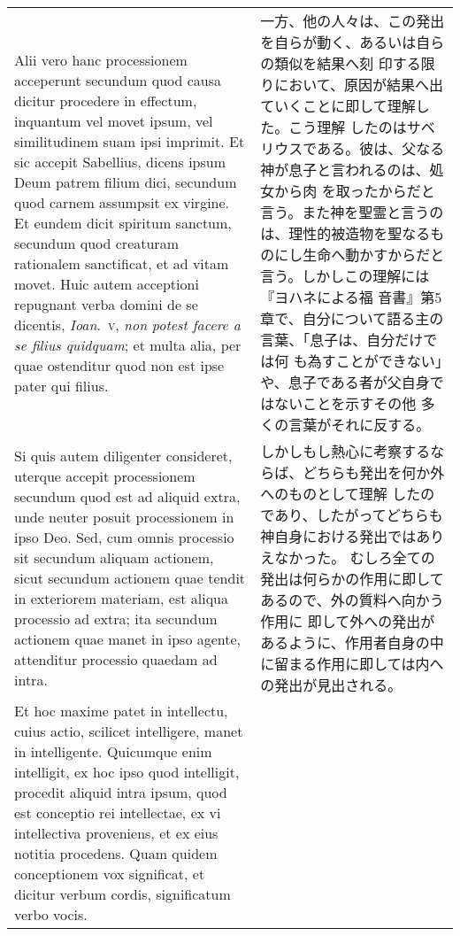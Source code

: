 \documentclass[10pt]{jsarticle} %
\begin{document}
\begin{longtable}{p{21em}p{21em}}
Alii vero hanc processionem acceperunt secundum
quod causa dicitur procedere in effectum, inquantum vel movet ipsum, vel
similitudinem suam ipsi imprimit. Et sic accepit Sabellius, dicens ipsum
Deum patrem filium dici, secundum quod carnem assumpsit ex virgine. Et
eundem dicit spiritum sanctum, secundum quod creaturam rationalem
sanctificat, et ad vitam movet. Huic autem acceptioni repugnant verba
domini de se dicentis, {\itshape Ioan}.~{\scshape v}, {\itshape non potest facere a se filius quidquam};
et multa alia, per quae ostenditur quod non est ipse pater qui
filius. 



&

一方、他の人々は、この発出を自らが動く、あるいは自らの類似を結果へ刻
 印する限りにおいて、原因が結果へ出ていくことに即して理解した。こう理解
 したのはサベリウスである。彼は、父なる神が息子と言われるのは、処女から肉
 を取ったからだと言う。また神を聖霊と言うのは、理性的被造物を聖なるも
 のにし生命へ動かすからだと言う。しかしこの理解には『ヨハネによる福
 音書』第5章で、自分について語る主の言葉、「息子は、自分だけでは何
 も為すことができない」や、息子である者が父自身ではないことを示すその他
 多くの言葉がそれに反する。


\\


Si quis autem diligenter consideret, uterque accepit
processionem secundum quod est ad aliquid extra, unde neuter posuit
processionem in ipso Deo. Sed, cum omnis processio sit secundum aliquam
actionem, sicut secundum actionem quae tendit in exteriorem materiam,
est aliqua processio ad extra; ita secundum actionem quae manet in ipso
agente, attenditur processio quaedam ad intra. 

&


しかしもし熱心に考察するならば、どちらも発出を何か外へのものとして理解
 したのであり、したがってどちらも神自身における発出ではありえなかった。
むしろ全ての発出は何らかの作用に即してあるので、外の質料へ向かう作用に
 即して外への発出があるように、作用者自身の中に留まる作用に即しては内へ
 の発出が見出される。


\\

Et hoc maxime patet in
intellectu, cuius actio, scilicet intelligere, manet in
intelligente. Quicumque enim intelligit, ex hoc ipso quod intelligit,
procedit aliquid intra ipsum, quod est conceptio rei intellectae, ex vi
intellectiva proveniens, et ex eius notitia procedens. Quam quidem
conceptionem vox significat, et dicitur verbum cordis, significatum
verbo vocis. 



\end{longtable}
\end{document}
